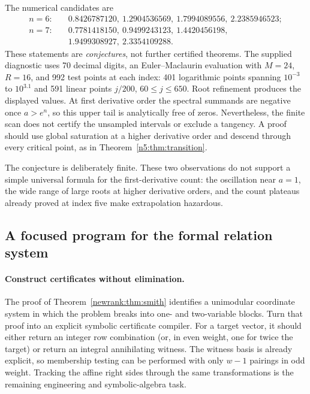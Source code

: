 The numerical candidates are
\begin{align*}
 n=6:\quad&0.8426787120,\ 1.2904536569,\ 1.7994089556,\ 2.2385946523;\\
 n=7:\quad&0.7781418150,\ 0.9499243123,\ 1.4420456198,\\
           &1.9499308927,\ 2.3354109288.
\end{align*}
These statements are \emph{conjectures}, not further certified theorems.
The supplied diagnostic uses 70 decimal digits, an Euler--Maclaurin
evaluation with $M=24$, $R=16$, and 992 test points at each index: 401
logarithmic points spanning $10^{-3}$ to $10^{3.1}$ and 591 linear points
$j/200$, $60\le j\le650$. Root refinement produces the displayed values.
At first derivative order the spectral summands are negative once
$a>e^n$, so this upper tail is analytically free of zeros. Nevertheless,
the finite scan does not certify the unsampled intervals or exclude a
tangency. A proof should use global saturation at a higher derivative
order and descend through every critical point, as in
Theorem~\ref{n5:thm:transition}.

The conjecture is deliberately finite. These two observations do not
support a simple universal formula for the first-derivative count:
the oscillation near $a=1$, the wide range of large roots at higher
derivative orders, and the count plateaus already proved at index five
make extrapolation hazardous.

\subsection{A focused program for the formal relation system}

\paragraph{Construct certificates without elimination.}
The proof of Theorem~\ref{newrank:thm:smith} identifies a unimodular
coordinate system in which the problem breaks into one- and two-variable
blocks. Turn that proof into an explicit symbolic certificate compiler.
For a target vector, it should either return an integer row combination
(or, in even weight, one for twice the target) or return an integral
annihilating witness. The witness basis is already explicit, so membership
testing can be performed with only $w-1$ pairings in odd weight. Tracking
the affine right sides through the same transformations is the remaining
engineering and symbolic-algebra task.

